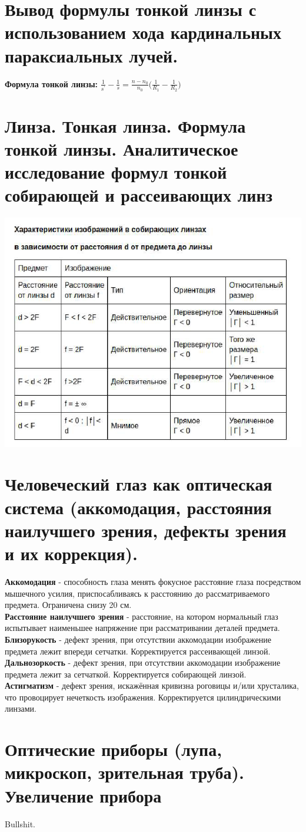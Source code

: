 \documentclass[14pt]{extarticle}
\begin{document}
\section{Вывод формулы тонкой линзы с использованием хода кардинальных параксиальных
лучей.}
\textbf{Формула тонкой линзы:} $\frac{1}{s^{'}} - 
\frac{1}{s} = \frac{n - n_0}{n_0} \bigl(\frac{1}{R_1}
-\frac{1}{R_2}\bigr)$
\section{Линза. Тонкая линза. Формула тонкой линзы. Аналитическое исследование формул
тонкой собирающей и рассеивающих линз}
\includegraphics{lense_analysis.png}
\section{ Человеческий глаз как оптическая система (аккомодация, 
расстояния наилучшего зрения, дефекты зрения и их коррекция).}
\textbf{Аккомодация} - способность глаза менять фокусное расстояние
глаза посредством мышечного усилия, приспосабливаясь к 
расстоянию до рассматриваемого предмета. Ограничена снизу 20 см.\\
\textbf{Расстояние наилучшего зрения} - расстояние, на котором
нормальный глаз испытывает наименьшее напряжение при 
рассматривании деталей предмета.\\
\textbf{Близорукость} - дефект зрения, при отсутствии 
аккомодации изображение предмета лежит впереди сетчатки. 
Корректируется рассеивающей линзой.\\
\textbf{Дальнозоркость} - дефект зрения, при отсутствии 
аккомодации изображение предмета лежит за сетчаткой. 
Корректируется собирающей линзой.\\
\textbf{Астигматизм} - дефект зрения, искажённая кривизна 
роговицы и/или хрусталика, что провоцирует нечеткость изображения. 
Корректируется цилиндрическими линзами.\\
\section{Оптические приборы (лупа, микроскоп, зрительная труба). Увеличение прибора}
Bullshit.
\end{document}
